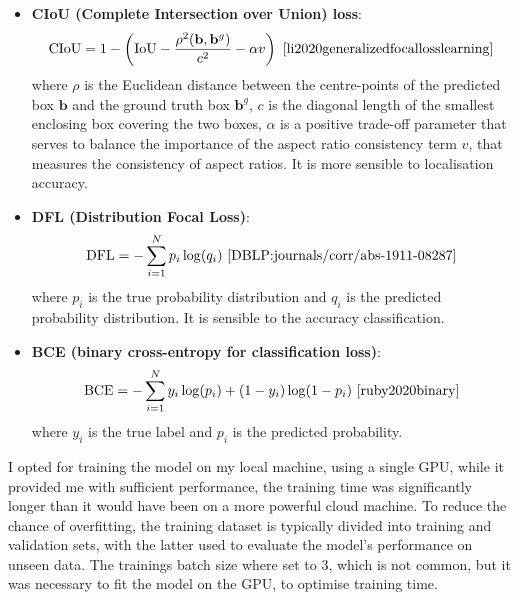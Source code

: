 \begin{itemize}
\item \textbf{CIoU (Complete Intersection over Union) loss}:
\begin{equation}
\text{CIoU} = 1 - \left( \text{IoU} - \frac{\rho^2(\mathbf{b}, \mathbf{b}^g)}{c^2} - \alpha v \right) ~\cite{li2020generalizedfocallosslearning}
\end{equation}
where \(\rho\) is the Euclidean distance between the centre-points of the predicted box \(\mathbf{b}\) and
 the ground truth box \(\mathbf{b}^g\), \(c\) is the diagonal length of the smallest enclosing box covering
 the two boxes, \(\alpha\) is a positive trade-off parameter that serves to balance the importance of the aspect ratio consistency term \(v\),  that measures the consistency of aspect
 ratios.
 It is more sensible to localisation accuracy.

\item \textbf{DFL (Distribution Focal Loss)}:
\begin{equation}
\text{DFL} = -\sum_{i=1}^{N} p_i \log(q_i)~\cite{DBLP:journals/corr/abs-1911-08287}
\end{equation}
where \(p_i\) is the true probability distribution and \(q_i\) is the predicted probability distribution.
It is sensible to the accuracy classification.
\item \textbf{BCE (binary cross-entropy for classification loss)}:
\begin{equation}
\text{BCE} = -\sum_{i=1}^{N} y_i \log(p_i) + (1 - y_i) \log(1 - p_i)~\cite{ruby2020binary}
\end{equation}
where \(y_i\) is the true label and \(p_i\) is the predicted probability.

\end{itemize}



I opted for training the model on my local machine, using a single GPU, while it provided me with sufficient performance, the training time was significantly longer than it would have been on a more powerful cloud machine.
To reduce the chance of overfitting, the training dataset is typically divided into training and validation sets,
with the latter used to evaluate the model's performance on unseen data.
The trainings batch size where set to 3, which is not common, but it was necessary to fit the model on the GPU,
to optimise training time.

